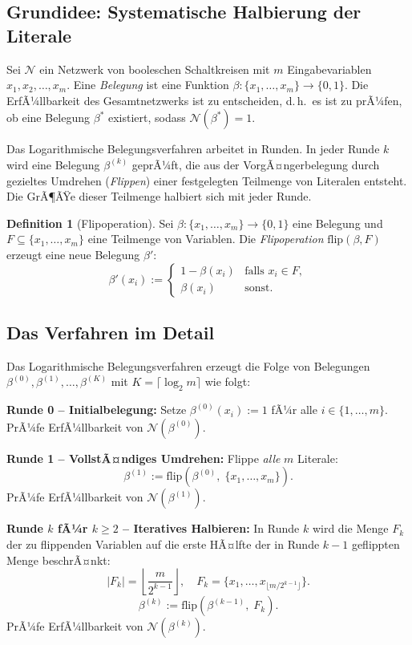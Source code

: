 ﻿\documentclass[a4paper,12pt]{article}
\theoremstyle{definition}
\newtheorem{definition}{Definition}
\begin{document}
\subsection{Grundidee: Systematische Halbierung der Literale}

Sei $\mathcal{N}$ ein Netzwerk von booleschen Schaltkreisen mit $m$ Eingabevariablen
$x_1, x_2, \ldots, x_m$. Eine \textit{Belegung} ist eine Funktion
$\beta: \{x_1, \ldots, x_m\} \to \{0, 1\}$.
Die ErfÃ¼llbarkeit des Gesamtnetzwerks ist zu entscheiden, d.\,h.\ es ist zu prÃ¼fen, ob
eine Belegung $\beta^*$ existiert, sodass $\mathcal{N}(\beta^*) = 1$.

Das Logarithmische Belegungsverfahren arbeitet in Runden. In jeder Runde $k$ wird eine
Belegung $\beta^{(k)}$ geprÃ¼ft, die aus der VorgÃ¤ngerbelegung durch gezieltes Umdrehen
(\textit{Flippen}) einer festgelegten Teilmenge von Literalen entsteht. Die GrÃ¶ÃŸe dieser
Teilmenge halbiert sich mit jeder Runde.

\begin{definition}[Flipoperation]
	Sei $\beta: \{x_1, \ldots, x_m\} \to \{0,1\}$ eine Belegung und $F \subseteq \{x_1, \ldots, x_m\}$
	eine Teilmenge von Variablen. Die \emph{Flipoperation} $\mathrm{flip}(\beta, F)$ erzeugt
	eine neue Belegung $\beta'$:
	\[
	\beta'(x_i) := \begin{cases} 1 - \beta(x_i) & \text{falls } x_i \in F, \\ \beta(x_i) & \text{sonst.} \end{cases}
	\]
\end{definition}

\subsection{Das Verfahren im Detail}

Das Logarithmische Belegungsverfahren erzeugt die Folge von Belegungen
$\beta^{(0)}, \beta^{(1)}, \ldots, \beta^{(K)}$ mit $K = \lceil \log_2 m \rceil$
wie folgt:

\medskip
\noindent\textbf{Runde 0 -- Initialbelegung:}
Setze $\beta^{(0)}(x_i) := 1$ fÃ¼r alle $i \in \{1, \ldots, m\}$.
PrÃ¼fe ErfÃ¼llbarkeit von $\mathcal{N}(\beta^{(0)})$.

\medskip
\noindent\textbf{Runde 1 -- VollstÃ¤ndiges Umdrehen:}
Flippe \emph{alle} $m$ Literale:
\[
\beta^{(1)} := \mathrm{flip}\!\left(\beta^{(0)},\; \{x_1, \ldots, x_m\}\right).
\]
PrÃ¼fe ErfÃ¼llbarkeit von $\mathcal{N}(\beta^{(1)})$.

\medskip
\noindent\textbf{Runde $k$ fÃ¼r $k \geq 2$ -- Iteratives Halbieren:}
In Runde $k$ wird die Menge $F_k$ der zu flippenden Variablen auf die erste HÃ¤lfte
der in Runde $k-1$ geflippten Menge beschrÃ¤nkt:
\[
|F_k| = \left\lfloor \frac{m}{2^{k-1}} \right\rfloor, \quad
F_k = \{x_1, \ldots, x_{\lfloor m/2^{k-1} \rfloor}\}.
\]
\[
\beta^{(k)} := \mathrm{flip}\!\left(\beta^{(k-1)},\; F_k\right).
\]
PrÃ¼fe ErfÃ¼llbarkeit von $\mathcal{N}(\beta^{(k)})$.
\end{document}
